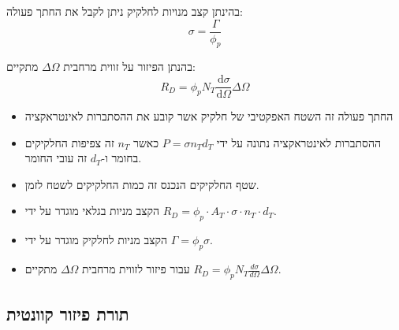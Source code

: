 \documentclass{tstextbook}
\begin{document}
\begin{corollary}
בהינתן קצב מנויות לחלקיק ניתן לקבל את החתך פעולה:
$$\sigma=\frac{\Gamma}{\phi_{p}}$$

\end{corollary}
\begin{proposition}
בהנתן הפיזור על זווית מרחבית \(\Delta \Omega\) מתקיים:
$$R_{D}=\phi_{p}N_{T}\frac{\mathrm{d} \sigma}{\mathrm{d} \Omega} \Delta \Omega$$

\end{proposition}
\begin{summary}
  \begin{itemize}
    \item החתך פעולה זה השטח האפקטיבי של חלקיק אשר קובע את ההסתברות לאינטראקציה
    \item ההסתברות לאינטראקציה נתונה על ידי \(P=\sigma n_{T}d_{T}\) כאשר \(n_{T}\) זה צפיפות החלקיקים בחומר ו-\(d_{T}\) זה עובי החומר.
    \item שטף החלקיקים הנכנס זה כמות החלקיקים לשטח לזמן. 
    \item הקצב מניות בגלאי מוגדר על ידי \(R_{D}=\phi_{p}\cdot A_{T}\cdot \sigma \cdot n_{T}\cdot d_{T}\).
    \item הקצב מניות לחלקיק מוגדר על ידי \(\Gamma=\phi_{p}\sigma\).
    \item עבור פיזור לזווית מרחבית \(\Delta \Omega\) מתקיים \(R_{D}=\phi_{p}N_{T}\frac{d\sigma}{d\Omega}\Delta\Omega\).
  \end{itemize}
\end{summary}
\subsection{תורת פיזור קוונטית}
\end{document}
